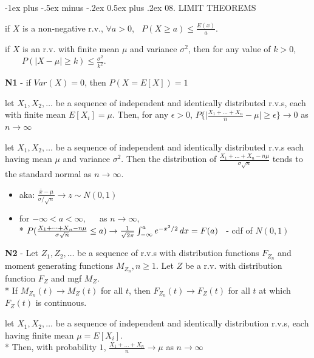 \documentclass[10pt, landscape]{article}
\makeatletter
\renewcommand{\section}{\@startsection{section}{1}{0mm}%
  {-1ex plus -.5ex minus -.2ex}%
  {0.5ex plus .2ex}%
{\normalfont\large\bfseries}}
\makeatother
\begin{document}
\begin{multicols*}{3}
    \section{08. LIMIT THEOREMS}

     if $X$ is a non-negative r.v., $\forall a > 0$, $\;\; P(X \geq a) \leq \frac{E(x)}{a}$.

     if $X$ is an r.v. with finite mean $\mu$ and variance $\sigma^2$, then for any value of  $k>0$, 
    $\quad \quad P(\vert X - \mu \vert \geq k) \leq \frac{\sigma^2}{k^2}$.

    \textbf{N1} - if $Var(X) = 0$, then $P(X = E[X]) = 1$

    let $X_1, X_2, \dots$ be a sequence of independent and identically distributed r.v.s, each with finite mean  $E[X_i] = \mu$. 
    Then, for any $\epsilon > 0$, 
    $P \{ \vert \frac{X_1 + \dots + X_n}{n} - \mu \vert \geq \epsilon \} \to 0 $ as $n \to \infty$

    let $X_1, X_2, \dots$ be a sequence of independent and identically distributed r.v.s each having mean $\mu$ and variance $\sigma^2$. 
    Then the distribution of $\frac{X_1 + \dots + X_n - n\mu}{\sigma \sqrt{n}}$ tends to the standard normal as $n \to \infty$.

    \begin{itemize}
      \item aka: $\frac{\bar{x} - \mu}{\sigma/\sqrt{n}} \to z \sim N(0, 1)$
      \item for $-\infty < a < \infty$, $\quad$ as $n \to \infty$,
        \\* $P (\frac{X_1 + \dots + X_n - n\mu}{\sigma \sqrt{n}} \leq a) \to \frac{1}{\sqrt{2\pi}} \int^a_{-\infty} e^{-x^2/2} \mathop{dx} = F(a) \;\; $ - cdf of $N(0,1)$
    \end{itemize}

    \textbf{N2} - Let $Z_1, Z_2, \dots$ be a sequence of r.v.s with distribution functions $F_{Z_n}$ and moment generating functions $M_{Z_n}, n \geq 1$.
    Let $Z$ be a r.v. with distribution function $F_Z$ and mgf $M_Z$. 
    \\* If $M_{Z_n} (t) \to M_Z(t)$ for all $t$, then $F_{Z_n}(t) \to F_Z(t)$ for all $t$ at which $F_Z(t)$ is continuous.

    let $X_1, X_2, \dots$ be a sequence of independent and identically distribution r.v.s, each having finite mean $\mu = E[X_i]$. 
    \\* Then, with probability  $1$, 
    $\frac{X_1 + \dots + X_n}{n} \to \mu$ as $n \to \infty$

    \begin{center}
    \end{center}

  \end{multicols*}

  
\end{document}
